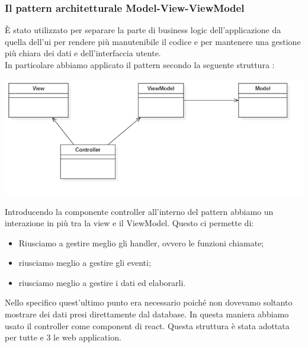 \subsubsection{Il pattern architetturale Model-View-ViewModel}
È stato utilizzato per separare la parte di business logic dell'applicazione da quella dell'ui per rendere più manutenibile il codice e per mantenere una gestione più chiara dei dati e dell'interfaccia utente. \\
In particolare abbiamo applicato il pattern secondo la seguente struttura : 

\begin{center}
    \includegraphics[scale = 0.4]{./res/img/MVVM.png}
  \end{center}
  
Introducendo la componente controller all'interno del pattern abbiamo un interazione in più tra la view e il ViewModel. Questo ci permette di:
\begin{itemize}
    \item Riusciamo a gestire meglio gli handler, ovvero le funzioni chiamate;
    \item riusciamo meglio a gestire gli eventi;
    \item riusciamo meglio a gestire i dati ed elaborarli.
\end{itemize}

Nello specifico quest'ultimo punto era necessario poiché non dovevamo soltanto mostrare dei dati presi direttamente dal database. In questa maniera abbiamo usato il controller come component di react. Questa struttura è stata adottata per tutte e 3 le web application. 